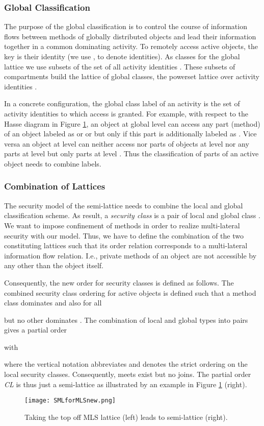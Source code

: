 \documentclass[10pt, conference, compsocconf]{IEEEtran}
\begin{document}
\subsubsection{Global Classification}
The purpose of the global classification is to control the course of information flows 
between methods of globally distributed objects and lead their information together in a common dominating activity.
To remotely access active objects, the key is their identity 
(we use ,  to denote identities). 
As classes for the global lattice we use subsets of the set of all 
activity identities . These subsets of compartments
build the lattice of global classes, the powerset lattice  over activity identities .

In a concrete configuration, the global class label of an activity is the set of
activity identities to which access is granted. For example, with 
respect to the Hasse diagram in Figure \ref{fig:slmmls}, an object at global level 
 can access any
part (method) of an object labeled as  or  or  
but only if this part is additionally labeled as .
Vice versa an object at level  can neither access  nor  parts of objects at level
 nor any parts at level  but only  parts at level . Thus the
classification of parts of an active object needs to combine labels.

\subsubsection{Combination of Lattices}
\label{sec:comblatt}
The security model of the semi-lattice needs to combine the local and global classification scheme.
As result, a {\it security class} is a pair of local and global class .
We want to impose confinement of methods in order to realize multi-lateral security with 
our model. Thus, we have to define the combination of the two constituting lattices such that its
order relation corresponds to a multi-lateral information flow relation. I.e., private methods 
of an object are not accessible by any other than the object itself.

Consequently, the new order for security classes is defined as follows.
The combined security class ordering for active objects is defined 
such that a method class  dominates  and also  for all 
 
but no other  dominates  . 
The combination of local and global types into pairs gives a partial order 

with 

where  the vertical notation  abbreviates  and
 denotes the strict ordering on the local security classes.
Consequently, meets exist but no joins. The
partial order {\it CL} is thus just a semi-lattice as illustrated by an example 
in Figure \ref{fig:slmmls} (right).
\begin{figure}
\vspace{-3ex}
\begin{center}
\texttt{[image: SMLforMLSnew.png]}
\end{center}
\vspace{-3ex}
\caption{Taking the top off MLS lattice (left) leads to semi-lattice (right).
\label{fig:slmmls}}
\vspace{-3ex}
\end{figure}
\end{document}

